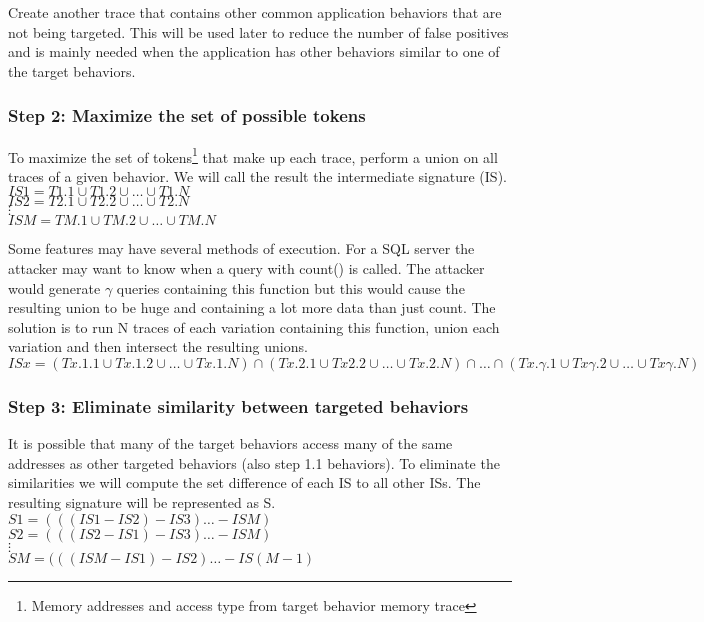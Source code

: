 \documentclass[11pt,a4paper, titlepage, oneside]{article}
\begin{document}
Create another trace that contains other common application behaviors that are not being targeted. This will be used later to reduce the number of false positives and is mainly needed when the application has other behaviors similar to one of the target behaviors.

\subsubsection{Step 2: Maximize the set of possible tokens}
To maximize the set of tokens\footnote{Memory addresses and access type from target behavior memory trace} that make up each trace, perform a union on all traces of a given behavior.  We will call the result the intermediate signature (IS). \\
$IS1 = T1.1\cup T1.2\cup\ldots\cup T1.N$ \\
$IS2 = T2.1\cup T2.2\cup\ldots\cup T2.N$ \\
$\vdots$ \\
$ISM = TM.1\cup TM.2\cup\ldots\cup TM.N$ 

Some features may have several methods of execution. For a SQL server the attacker may want to know when a query with count() is called. The attacker would generate $\gamma$ queries containing this function but this would cause the resulting union to be huge and containing a lot more data than just count. The solution is to run N traces of each variation containing this function, union each variation and then intersect the resulting unions. \\
$ISx = (Tx.1.1\cup Tx.1.2\cup\ldots\cup Tx.1.N)\cap(Tx.2.1\cup Tx2.2\cup\ldots\cup Tx.2.N)\cap\ldots\cap(Tx.\gamma.1\cup Tx\gamma.2\cup\ldots\cup Tx\gamma.N)$

\subsubsection{Step 3: Eliminate similarity between targeted behaviors}
It is possible that many of the target behaviors access many of the same addresses as other targeted behaviors (also step 1.1 behaviors). To eliminate the similarities we will compute the set difference of each IS to all other ISs. The resulting signature will be represented as S. \\
$S1 = (((IS1 - IS2) - IS3)\ldots - ISM)$ \\
$S2 = (((IS2 - IS1) - IS3)\ldots - ISM)$ \\
$\vdots$ \\
$SM = (((ISM - IS1) - IS2)\ldots - IS(M-1)$ 
\end{document}
